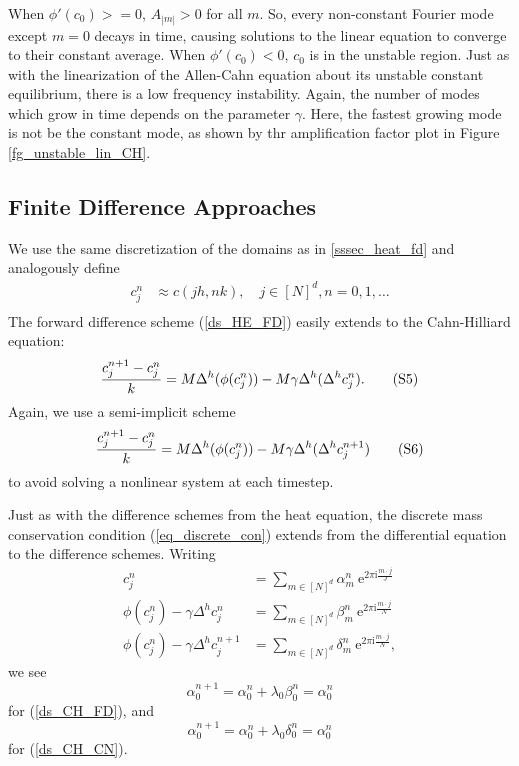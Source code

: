 \documentclass[12pt, reqno]{report}
\theoremstyle{definition}
\theoremstyle{remark}
\newcommand{\e}{\mathrm{e}}
\renewcommand{\i}{\mathrm{i}}
\begin{document}
When $\phi'(c_{0})>=0$, $A_{|m|}>0$ for all $m$. 
So, every non-constant Fourier mode except $m=0$ decays in time, causing solutions to the linear equation to converge to their constant average. 
When $\phi'(c_{0})<0$, $c_{0}$ is in the unstable region. 
Just as with the linearization of the Allen-Cahn equation about its unstable constant equilibrium, there is a low frequency instability. 
Again, the number of modes which grow in time depends on the parameter $\gamma$. 
Here, the fastest growing mode is not be the constant mode, as shown by thr amplification factor plot in Figure \ref{fg_unstable_lin_CH}. 





\subsection{Finite Difference Approaches} \label{sssec_CH_FD}

We use the same discretization of the domains as in \ref{sssec_heat_fd} and analogously define 
\begin{align*}
	c_j^n&\approx c(jh,nk),\quad j\in[N]^d,n=0,1,\ldots\\
\end{align*}
The forward difference scheme (\ref{ds_HE_FD}) easily extends to the Cahn-Hilliard equation: 
\begin{equation} \label{ds_CH_FD}
	\frac{c_j^{n+1}-c_j^n}{k}=M\Delta^h(\phi(c_j^n))-M\gamma\Delta^h(\Delta^h c_j^n).{\tag{S5}}
\end{equation}
Again, we use a semi-implicit scheme
\begin{equation} \label{ds_CH_CN}
    \frac{c_j^{n+1}-c_j^n}{k } =M\Delta^h(\phi(c_j^n))-M\gamma\Delta^h(\Delta^hc_j^{n+1}){\tag{S6}}
\end{equation}
to avoid solving a nonlinear system at each timestep. 

Just as with the difference schemes from the heat equation, the discrete mass conservation condition (\ref{eq_discrete_con}) extends from the differential equation to the difference schemes.
Writing 
\begin{align*}
	c_j^n&=\sum_{m\in[N]^d}\alpha_m^n~\e^{2\pi\i\frac{m\cdot j}{J}}\\
    \phi(c_j^n)-\gamma\Delta^hc_j^n&=\sum_{m\in[N]^d}\beta_m^n~\e^{2\pi\i\frac{m\cdot j}{N}}\\
    \phi(c_j^n)-\gamma\Delta^hc_j^{n+1}&=\sum_{m\in[N]^d}\delta_m^n~\e^{2\pi\i\frac{m\cdot j}{N}},
\end{align*}
we see
\begin{equation*}
	\alpha_0^{n+1}=\alpha_0^n+\lambda_0\beta_0^n=\alpha_0^n
\end{equation*}
for (\ref{ds_CH_FD}), and 
\begin{equation*}
    \alpha_0^{n+1}=\alpha_0^n+\lambda_0\delta_0^n=\alpha_0^n
\end{equation*}
for (\ref{ds_CH_CN}).
\end{document}
